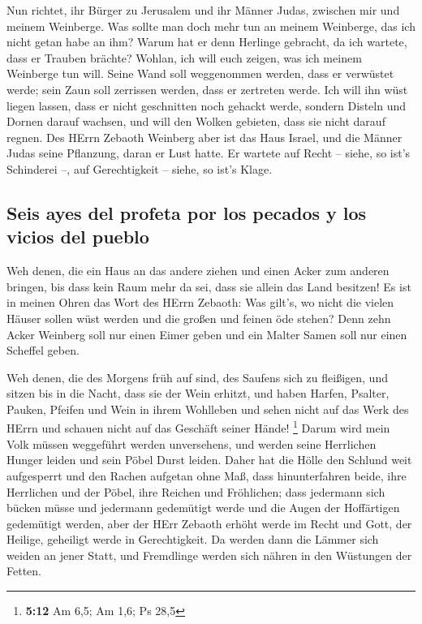  Nun richtet, ihr Bürger zu Jerusalem und ihr Männer
Judas, zwischen mir und meinem Weinberge.  Was sollte man
doch mehr tun an meinem Weinberge, das ich nicht getan habe an ihm?
Warum hat er denn Herlinge gebracht, da ich wartete, dass er Trauben
brächte?  Wohlan, ich will euch zeigen, was ich meinem
Weinberge tun will. Seine Wand soll weggenommen werden, dass er
verwüstet werde; sein Zaun soll zerrissen werden, dass er zertreten
werde.  Ich will ihn wüst liegen lassen, dass er nicht
geschnitten noch gehackt werde, sondern Disteln und Dornen darauf
wachsen, und will den Wolken gebieten, dass sie nicht darauf regnen.
 Des HErrn Zebaoth Weinberg aber ist das Haus Israel, und
die Männer Judas seine Pflanzung, daran er Lust hatte. Er wartete auf
Recht -- siehe, so ist's Schinderei --, auf Gerechtigkeit -- siehe, so
ist's Klage.

\hypertarget{seis-ayes-del-profeta-por-los-pecados-y-los-vicios-del-pueblo}{%
\subsection{Seis ayes del profeta por los pecados y los vicios del
pueblo}\label{seis-ayes-del-profeta-por-los-pecados-y-los-vicios-del-pueblo}}

 Weh denen, die ein Haus an das andere ziehen und einen
Acker zum anderen bringen, bis dass kein Raum mehr da sei, dass sie
allein das Land besitzen!  Es ist in meinen Ohren das Wort
des HErrn Zebaoth: Was gilt's, wo nicht die vielen Häuser sollen wüst
werden und die großen und feinen öde stehen?  Denn zehn
Acker Weinberg soll nur einen Eimer geben und ein Malter Samen soll nur
einen Scheffel geben.

 Weh denen, die des Morgens früh auf sind, des Saufens
sich zu fleißigen, und sitzen bis in die Nacht, dass sie der Wein
erhitzt,  und haben Harfen, Psalter, Pauken, Pfeifen und
Wein in ihrem Wohlleben und sehen nicht auf das Werk des HErrn und
schauen nicht auf das Geschäft seiner Hände! \footnote{\textbf{5:12} Am
  6,5; Am 1,6; Ps 28,5}  Darum wird mein Volk müssen
weggeführt werden unversehens, und werden seine Herrlichen Hunger leiden
und sein Pöbel Durst leiden.  Daher hat die Hölle den
Schlund weit aufgesperrt und den Rachen aufgetan ohne Maß, dass
hinunterfahren beide, ihre Herrlichen und der Pöbel, ihre Reichen und
Fröhlichen;  dass jedermann sich bücken müsse und
jedermann gedemütigt werde und die Augen der Hoffärtigen gedemütigt
werden,  aber der HErr Zebaoth erhöht werde im Recht und
Gott, der Heilige, geheiligt werde in Gerechtigkeit.  Da
werden dann die Lämmer sich weiden an jener Statt, und Fremdlinge werden
sich nähren in den Wüstungen der Fetten.

